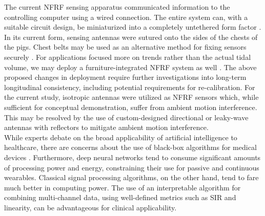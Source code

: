 \documentclass[journal]{IEEEtran}
\begin{document}
The current NFRF sensing apparatus communicated information to the controlling computer using a wired connection. The entire system can, with a suitable circuit design, be miniaturized into a completely untethered form factor \cite{zhouRadioFrequencyNearFieldSensor2023}. In its current form, sensing antennas were sutured onto the sides of the chests of the pigs. Chest belts may be used as an alternative method for fixing sensors securely \cite{sharmaWearableRadiofrequencySensing2020}. For applications focused more on trends rather than the actual tidal volume, we may deploy a furniture-integrated NFRF system as well \cite{zhangFurnitureIntegratedRespirationSensors2021}.  The above proposed changes in deployment require further investigations into long-term longitudinal consistency, including potential requirements for re-calibration. For the current study, isotropic antennas were utilized as NFRF sensors which, while sufficient for conceptual demonstration, suffer from ambient motion interference. This may be resolved by the use of custom-designed directional or leaky-wave antennas with reflectors to mitigate ambient motion interference. \\
While experts debate on the broad applicability of artificial intelligence to healthcare, there are concerns about the use of black-box algorithms for medical devices \cite{amannExplainabilityArtificialIntelligence2020}. Furthermore, deep neural networks tend to consume significant amounts of processing power and energy, constraining their use for passive and continuous wearables. Classical signal processing algorithms, on the other hand, tend to fare much better in computing power. The use of an interpretable algorithm for combining multi-channel data, using well-defined metrics such as SIR and linearity, can be advantageous for clinical applicability.
\end{document}
